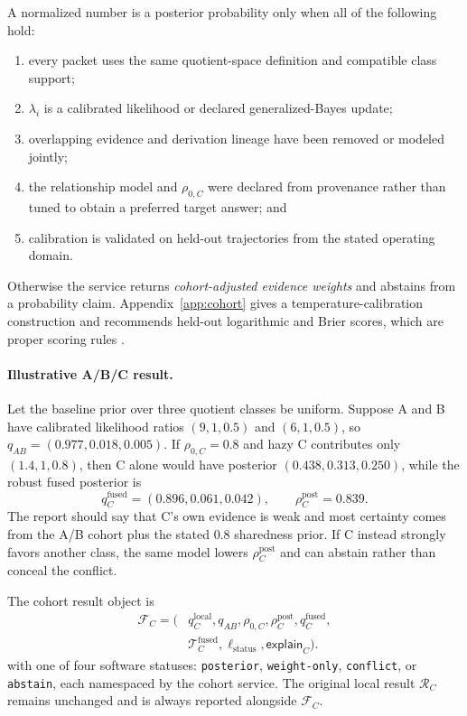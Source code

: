 \documentclass[11pt]{article}
\begin{document}
    A normalized number is a posterior probability only when all of the following hold:
    \begin{enumerate}[nosep]
    \item every packet uses the same quotient-space definition and compatible class support;
    \item $\lambda_i$ is a calibrated likelihood or declared generalized-Bayes update;
    \item overlapping evidence and derivation lineage have been removed or modeled jointly;
    \item the relationship model and $\rho_{0,C}$ were declared from provenance rather than
    tuned to obtain a preferred target answer; and
    \item calibration is validated on held-out trajectories from the stated operating domain.
    \end{enumerate}
    Otherwise the service returns \emph{cohort-adjusted evidence weights} and abstains from a
    probability claim. Appendix~\ref{app:cohort} gives a temperature-calibration construction
    and recommends held-out logarithmic and Brier scores, which are proper scoring rules
    \cite{gneiting2007}.

    \paragraph{Illustrative A/B/C result.}
    Let the baseline prior over three quotient classes be uniform. Suppose A and B have
    calibrated likelihood ratios $(9,1,0.5)$ and $(6,1,0.5)$, so
    $q_{AB}=(0.977,0.018,0.005)$. If $\rho_{0,C}=0.8$ and hazy C contributes only
    $(1.4,1,0.8)$, then C alone would have posterior
    $(0.438,0.313,0.250)$, while the robust fused posterior is
    \begin{equation}
        q_C^{\mathrm{fused}}=(0.896,0.061,0.042),
        \qquad \rho_C^{\mathrm{post}}=0.839.
        \label{eq:cohort-worked-result}
    \end{equation}
    The report should say that C's own evidence is weak and most certainty comes from the
    A/B cohort plus the stated $0.8$ sharedness prior. If C instead strongly favors another
    class, the same model lowers $\rho_C^{\mathrm{post}}$ and can abstain rather than conceal
    the conflict.

    The cohort result object is
    \begin{equation}
        \boxed{\begin{aligned}
                   \mathcal F_C=\bigl(&q_C^{\mathrm{local}},q_{AB},\rho_{0,C},
                   \rho_C^{\mathrm{post}},q_C^{\mathrm{fused}},\\
                   &\mathcal T_C^{\mathrm{fused}},\ell_{\mathrm{status}},
                   \mathsf{explain}_C\bigr).
        \end{aligned}}
        \label{eq:cohort-result-object}
    \end{equation}
    with one of four software statuses: \texttt{posterior}, \texttt{weight-only},
    \texttt{conflict}, or \texttt{abstain}, each namespaced by the cohort service. The
    original local result $\mathcal R_C$ remains unchanged and is always reported alongside
    $\mathcal F_C$.
\end{document}
